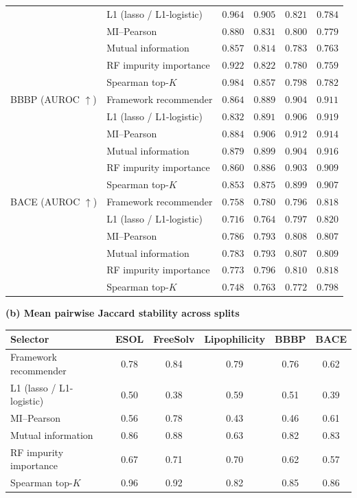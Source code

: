 \documentclass[10pt,a4paper]{article}
\begin{document}
\begin{table}[H]
\begin{tabular}{@{}llcccc@{}}
 & L1 (lasso / L1-logistic) & $0.964$ & $0.905$ & $0.821$ & $0.784$ \\
 & MI--Pearson & $0.880$ & $0.831$ & $0.800$ & $0.779$ \\
 & Mutual information & $\mathbf{0.857}$ & $\mathbf{0.814}$ & $0.783$ & $0.763$ \\
 & RF impurity importance & $0.922$ & $0.822$ & $\mathbf{0.780}$ & $\mathbf{0.759}$ \\
 & Spearman top-$K$ & $0.984$ & $0.857$ & $0.798$ & $0.782$ \\
\midrule
BBBP (AUROC $\uparrow$) & Framework recommender & $0.864$ & $0.889$ & $0.904$ & $0.911$ \\
 & L1 (lasso / L1-logistic) & $0.832$ & $0.891$ & $0.906$ & $\mathbf{0.919}$ \\
 & MI--Pearson & $\mathbf{0.884}$ & $\mathbf{0.906}$ & $\mathbf{0.912}$ & $0.914$ \\
 & Mutual information & $0.879$ & $0.899$ & $0.904$ & $0.916$ \\
 & RF impurity importance & $0.860$ & $0.886$ & $0.903$ & $0.909$ \\
 & Spearman top-$K$ & $0.853$ & $0.875$ & $0.899$ & $0.907$ \\
\midrule
BACE (AUROC $\uparrow$) & Framework recommender & $0.758$ & $0.780$ & $0.796$ & $0.818$ \\
 & L1 (lasso / L1-logistic) & $0.716$ & $0.764$ & $0.797$ & $\mathbf{0.820}$ \\
 & MI--Pearson & $\mathbf{0.786}$ & $0.793$ & $0.808$ & $0.807$ \\
 & Mutual information & $0.783$ & $0.793$ & $0.807$ & $0.809$ \\
 & RF impurity importance & $0.773$ & $\mathbf{0.796}$ & $\mathbf{0.810}$ & $0.818$ \\
 & Spearman top-$K$ & $0.748$ & $0.763$ & $0.772$ & $0.798$ \\
\bottomrule
\end{tabular}

\medskip\textbf{(b) Mean pairwise Jaccard stability across splits}\par\smallskip
\begin{tabular}{@{}lccccc@{}}
\toprule
Selector & ESOL & FreeSolv & Lipophilicity & BBBP & BACE \\
\midrule
Framework recommender & 0.78 & 0.84 & 0.79 & 0.76 & 0.62 \\
L1 (lasso / L1-logistic) & 0.50 & 0.38 & 0.59 & 0.51 & 0.39 \\
MI--Pearson & 0.56 & 0.78 & 0.43 & 0.46 & 0.61 \\
Mutual information & 0.86 & 0.88 & 0.63 & 0.82 & 0.83 \\
RF impurity importance & 0.67 & 0.71 & 0.70 & 0.62 & 0.57 \\
Spearman top-$K$ & 0.96 & 0.92 & 0.82 & 0.85 & 0.86 \\
\bottomrule
\end{tabular}
\end{table}
\end{document}
